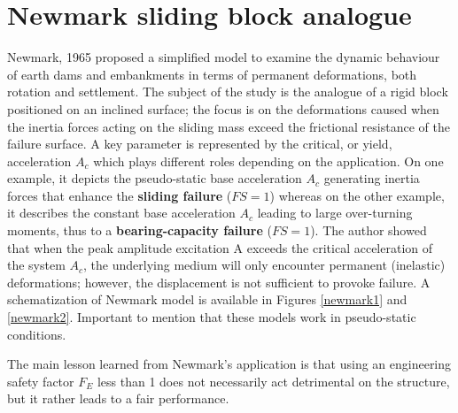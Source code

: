 \documentclass[12pt,a4paper]{report}
\begin{document}
\section{Newmark sliding block analogue}
Newmark, 1965 \cite{veletsos1965deformation} proposed a simplified model to examine the dynamic behaviour of earth dams and embankments in terms of permanent deformations, both rotation and settlement. The subject of the study is the analogue of a rigid block positioned on an inclined surface; the focus is on the deformations caused when the inertia forces acting on the sliding mass exceed the frictional resistance of the failure surface. A key parameter is represented by the critical, or yield, acceleration $A_c$ which plays different roles depending on the application. On one example, it depicts the pseudo-static base acceleration $A_c$ generating inertia forces that enhance the \textbf{sliding failure} ($FS=1$) whereas on the other example, it describes the constant base acceleration $A_c$ leading to large over-turning moments, thus to a \textbf{bearing-capacity failure} ($FS=1$). The author showed that when the peak amplitude excitation A exceeds the critical acceleration of the system $A_c$, the underlying medium will only encounter permanent (inelastic) deformations; however, the displacement is not sufficient to provoke failure. A schematization of Newmark model is available in Figures \ref{newmark1} and \ref{newmark2}. Important to mention that these models work in pseudo-static conditions. 

The main lesson learned from Newmark's application is that using an engineering safety factor $F_E$ less than 1 does not necessarily act detrimental on the structure, but it rather leads to a fair performance.
 
\end{document}
